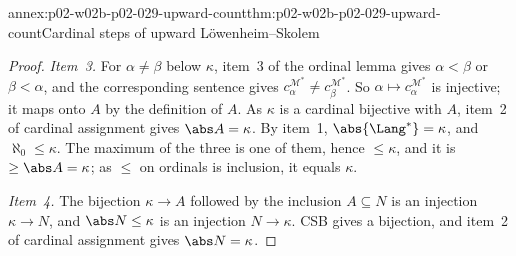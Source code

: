 \begin{annexitem}{annex:p02-w02b-p02-029-upward-count}{thm:p02-w02b-p02-029-upward-count}{Cardinal steps of upward L\"owenheim--Skolem}
\begin{proof}
\emph{Item~3.} For \(\alpha\neq\beta\) below \(\kappa\), item~3 of the ordinal
lemma gives \(\alpha<\beta\) or \(\beta<\alpha\), and the corresponding
sentence gives \(c_\alpha^{\mathcal M^*}\neq c_\beta^{\mathcal M^*}\). So
\(\alpha\mapsto c_\alpha^{\mathcal M^*}\) is injective; it maps onto \(A\)
by the definition of \(A\). As \(\kappa\) is a cardinal bijective with
\(A\), item~2 of cardinal assignment gives \(\abs A=\kappa\). By item~1,
\(\abs{\Lang^*}=\kappa\), and \(\aleph_0\leq\kappa\). The maximum of the
three is one of them, hence \(\leq\kappa\), and it is \(\geq\abs A=\kappa\);
as \(\leq\) on ordinals is inclusion, it equals \(\kappa\).

\emph{Item~4.} The bijection \(\kappa\to A\) followed by the inclusion
\(A\subseteq N\) is an injection \(\kappa\to N\), and \(\abs N\leq\kappa\) is
an injection \(N\to\kappa\). CSB gives a bijection, and item~2 of cardinal
assignment gives \(\abs N=\kappa\).
\end{proof}
\end{annexitem}

